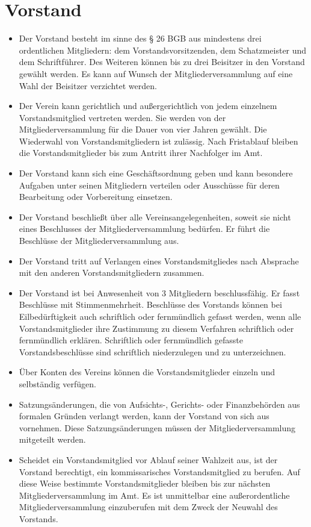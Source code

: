 \documentclass[a4paper,10pt]{article}
\begin{document}
\section{Vorstand}
  \begin{itemize}
   \item Der Vorstand besteht im sinne des § 26 BGB aus mindestens drei ordentlichen Mitgliedern: dem Vorstandsvorsitzenden, dem Schatzmeister und dem Schriftführer. Des Weiteren können bis zu drei Beisitzer in den Vorstand gewählt werden. Es kann auf Wunsch der Mitgliederversammlung auf eine Wahl der Beisitzer verzichtet werden.
   \item Der Verein kann gerichtlich und außergerichtlich von jedem einzelnem Vorstandsmitglied vertreten werden. Sie werden von der Mitgliederversammlung für die Dauer von vier Jahren gewählt. Die Wiederwahl von Vorstandsmitgliedern ist zulässig. Nach Fristablauf bleiben die Vorstandsmitglieder bis zum Antritt ihrer Nachfolger im Amt. 
   \item Der Vorstand kann sich eine Geschäftsordnung geben und kann besondere Aufgaben unter seinen Mitgliedern verteilen oder Ausschüsse für deren Bearbeitung oder Vorbereitung einsetzen. 
   \item Der Vorstand beschließt über alle Vereinsangelegenheiten, soweit sie nicht eines Beschlusses der Mitgliederversammlung bedürfen. Er führt die Beschlüsse der Mitgliederversammlung aus. 
   \item Der Vorstand tritt auf Verlangen eines Vorstandsmitgliedes nach Absprache mit den anderen Vorstandsmitgliedern zusammen. 
   \item Der Vorstand ist bei Anwesenheit von 3 Mitgliedern beschlussfähig. Er fasst Beschlüsse mit Stimmenmehrheit. Beschlüsse des Vorstands können bei Eilbedürftigkeit auch schriftlich oder fernmündlich gefasst werden, wenn alle Vorstandsmitglieder ihre Zustimmung zu diesem Verfahren schriftlich oder fernmündlich erklären. Schriftlich oder fernmündlich gefasste Vorstandsbeschlüsse sind schriftlich niederzulegen und zu unterzeichnen. 
   \item Über Konten des Vereins können die Vorstandsmitglieder einzeln und selbständig verfügen. 
   \item Satzungsänderungen, die von Aufsichts-, Gerichts- oder Finanzbehörden aus formalen Gründen verlangt werden, kann der Vorstand von sich aus vornehmen. Diese Satzungsänderungen müssen der Mitgliederversammlung mitgeteilt werden. 
   \item Scheidet ein Vorstandsmitglied vor Ablauf seiner Wahlzeit aus, ist der Vorstand berechtigt, ein kommissarisches Vorstandsmitglied zu berufen. Auf diese Weise bestimmte Vorstandsmitglieder bleiben bis zur nächsten Mitgliederversammlung im Amt. Es ist unmittelbar eine außerordentliche Mitgliederversammlung einzuberufen mit dem Zweck der Neuwahl des Vorstands. 

\end{itemize}
\end{document}
